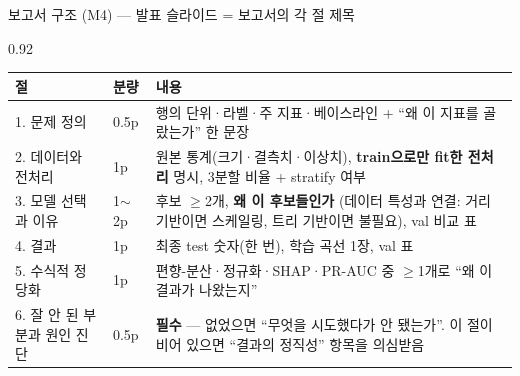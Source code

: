 \begin{frame}{보고서 구조 (M4) --- 발표 슬라이드 = 보고서의 각 절 제목}
\begin{center}\begin{varwidth}{0.92\textwidth}
  \small
  \begin{tabular}{@{}llp{7.6cm}@{}}
    \toprule
    절 & 분량 & 내용 \\
    \midrule
    1. 문제 정의 & 0.5p & 행의 단위·라벨·주 지표·베이스라인
       + ``왜 이 지표를 골랐는가'' 한 문장 \\
    2. 데이터와 전처리 & 1p & 원본 통계(크기·결측치·이상치),
       \textbf{train으로만 fit한 전처리} 명시, 3분할 비율 +
       stratify 여부 \\
    3. 모델 선택과 이유 & 1$\sim$2p & 후보 $\geq$2개, \textbf{왜
       이 후보들인가} (데이터 특성과 연결: 거리 기반이면
       스케일링, 트리 기반이면 불필요), val 비교 표 \\
    4. 결과 & 1p & 최종 test 숫자(한 번), 학습 곡선 1장, val 표 \\
    5. 수식적 정당화 & 1p & 편향-분산·정규화·SHAP·PR-AUC 중
       $\geq$1개로 ``왜 이 결과가 나왔는지'' \\
    6. 잘 안 된 부분과 원인 진단 & 0.5p & \textbf{필수} --- 없었으면
       ``무엇을 시도했다가 안 됐는가''. 이 절이 비어 있으면
       ``결과의 정직성'' 항목을 의심받음 \\
    \bottomrule
  \end{tabular}
\end{varwidth}\end{center}
\end{frame}
